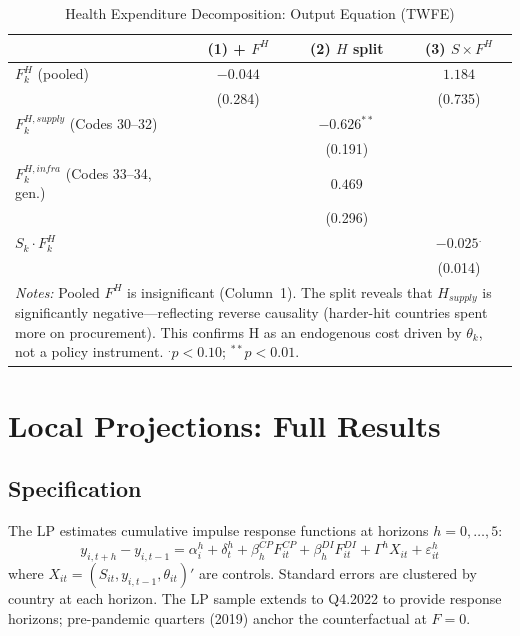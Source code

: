 \documentclass[12pt, a4paper]{article}
\begin{document}
\begin{table}[htbp]
\centering
\caption{Health Expenditure Decomposition: Output Equation (TWFE)}
\label{tab:h_decomp}
\small
\begin{tabular}{lccc}
\toprule
 & (1) + $F^H$ & (2) $H$ split & (3) $S \times F^H$ \\
\midrule
$F_k^H$ (pooled)
  & $-0.044$ &  & $1.184$ \\
  & (0.284)  &  & (0.735) \\[3pt]
$F_k^{H,supply}$ (Codes 30--32)
  &  & $-0.626^{**}$ & \\
  &  & (0.191)       & \\[3pt]
$F_k^{H,infra}$ (Codes 33--34, gen.)
  &  & $0.469$ & \\
  &  & (0.296) & \\[3pt]
$S_k \cdot F_k^H$
  &  &  & $-0.025^{.}$ \\
  &  &  & (0.014) \\[3pt]
\bottomrule
\multicolumn{4}{p{11cm}}{\footnotesize \textit{Notes:} Pooled $F^H$ is insignificant (Column~1). The split reveals that $H_{supply}$ is significantly negative---reflecting reverse causality (harder-hit countries spent more on procurement). This confirms H as an endogenous cost driven by $\theta_k$, not a policy instrument. $^{.}p<0.10$; $^{**}p<0.01$.} \\
\end{tabular}
\end{table}


\section{Local Projections: Full Results}
\label{app:lp}

\subsection{Specification}

The LP estimates cumulative impulse response functions at horizons $h = 0, \ldots, 5$:
\begin{equation}
    y_{i,t+h} - y_{i,t-1} = \alpha_i^h + \delta_t^h + \beta_h^{CP} F_{it}^{CP} + \beta_h^{DI} F_{it}^{DI} + \Gamma^h X_{it} + \varepsilon_{it}^h
\end{equation}
where $X_{it} = (S_{it}, y_{i,t-1}, \theta_{it})'$ are controls. Standard errors are clustered by country at each horizon. The LP sample extends to Q4.2022 to provide response horizons; pre-pandemic quarters (2019) anchor the counterfactual at $F = 0$.
\end{document}
